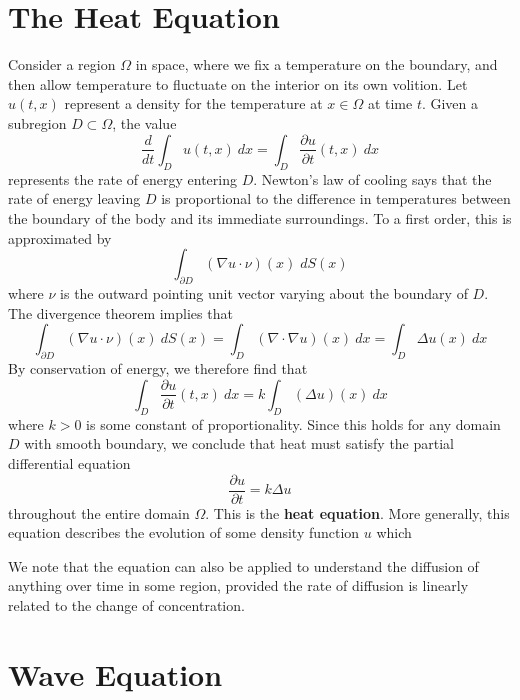 \section{The Heat Equation}

Consider a region $\Omega$ in space, where we fix a temperature on the boundary, and then allow temperature to fluctuate on the interior on its own volition. Let $u(t,x)$ represent a density for the temperature at $x \in \Omega$ at time $t$. Given a subregion $D \subset \Omega$, the value
%
\[ \frac{d}{dt} \int_D u(t,x)\ dx = \int_D \frac{\partial u}{\partial t}(t,x)\ dx \]
%
represents the rate of energy entering $D$. Newton's law of cooling says that the rate of energy leaving $D$ is proportional to the difference in temperatures between the boundary of the body and its immediate surroundings. To a first order, this is approximated by
%
\[ \int_{\partial D} (\nabla u \cdot \nu)(x)\; dS(x) \]
%
where $\nu$ is the outward pointing unit vector varying about the boundary of $D$. The divergence theorem implies that
%
\[ \int_{\partial D} (\nabla u \cdot \nu)(x)\ dS(x) = \int_D (\nabla \cdot \nabla u)(x)\ dx = \int_D \Delta u(x)\ dx \]
%
By conservation of energy, we therefore find that
%
\[ \int_D \frac{\partial u}{\partial t}(t,x)\ dx = k \int_D (\Delta u)(x)\ dx \]
%
where $k > 0$ is some constant of proportionality. Since this holds for any domain $D$ with smooth boundary, we conclude that heat must satisfy the partial differential equation
%
\[ \frac{\partial u}{\partial t} = k \Delta u \]
%
throughout the entire domain $\Omega$. This is the {\bf heat equation}. More generally, this equation describes the evolution of some density function $u$ which

We note that the equation can also be applied to understand the diffusion of anything over time in some region, provided the rate of diffusion is linearly related to the change of concentration.

\section{Wave Equation}

